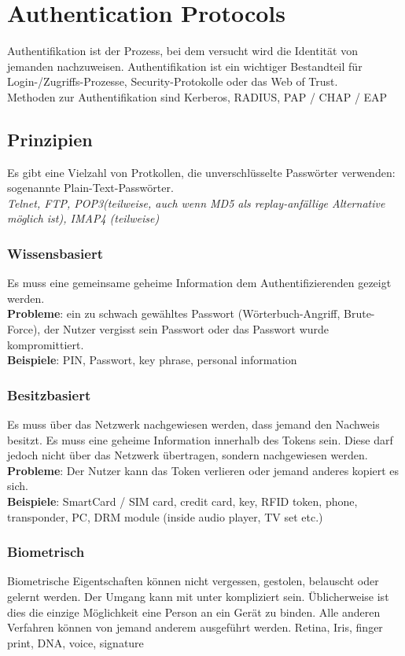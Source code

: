 \documentclass{article} %
\begin{document}
\section{Authentication Protocols}
Authentifikation ist der Prozess, bei dem versucht wird die Identität von jemanden nachzuweisen. Authentifikation ist ein wichtiger Bestandteil für Login-/Zugriffs-Prozesse, Security-Protokolle oder das Web of Trust.\\


\noindent Methoden zur Authentifikation sind Kerberos, RADIUS, PAP / CHAP / EAP 

\subsection{Prinzipien}
Es gibt eine Vielzahl von Protkollen, die unverschlüsselte Passwörter verwenden: sogenannte Plain-Text-Passwörter.\\
\textit{Telnet, FTP, POP3(teilweise, auch wenn MD5 als replay-anfällige Alternative möglich ist), IMAP4 (teilweise)}

\subsubsection{Wissensbasiert} 
Es muss eine gemeinsame geheime Information dem Authentifizierenden gezeigt werden.\\ \textbf{Probleme}: ein zu schwach gewähltes Passwort (Wörterbuch-Angriff, Brute-Force), der Nutzer vergisst sein Passwort oder das Passwort wurde kompromittiert.\\
\textbf{Beispiele}: PIN, Passwort, key phrase, personal information

\subsubsection{Besitzbasiert} 
Es muss über das Netzwerk nachgewiesen werden, dass jemand den Nachweis besitzt. Es muss eine geheime Information innerhalb des Tokens sein. Diese darf jedoch nicht über das Netzwerk übertragen, sondern nachgewiesen werden. \\
\textbf{Probleme}: Der Nutzer kann das Token verlieren oder jemand anderes kopiert es sich.\\
\textbf{Beispiele}: SmartCard / SIM card, credit card, key, RFID token, phone, transponder, PC, DRM module (inside audio player, TV set etc.) 

\subsubsection{Biometrisch} 
Biometrische Eigentschaften können nicht vergessen, gestolen, belauscht oder gelernt werden. Der Umgang kann mit unter kompliziert sein. Üblicherweise ist dies die einzige Möglichkeit eine Person an ein Gerät zu binden. Alle anderen Verfahren können von jemand anderem ausgeführt werden.
 Retina, Iris, finger print, DNA, voice, signature
 
\end{document}
